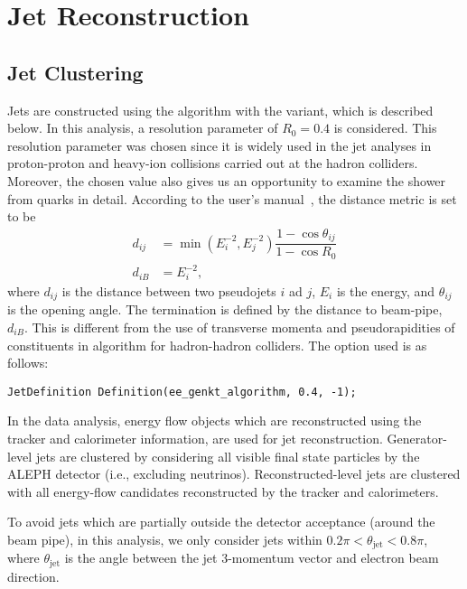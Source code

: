 \section{Jet Reconstruction}\label{Section:JetReconstruction}

\subsection{Jet Clustering}

Jets are constructed using the \ak algorithm with the \ee variant, which is described below. In this analysis, a resolution parameter of $R_0 = 0.4$ is considered. This resolution parameter was chosen since it is widely used in the jet analyses in proton-proton and heavy-ion collisions carried out at the hadron colliders. Moreover, the chosen value also gives us an opportunity to examine the shower from quarks in detail. According to the \fastjet user's manual~\cite{Cacciari:2005hq,Cacciari:2011ma}, the distance metric is set to be
%
\begin{align}
    d_{ij} &= \min\left(E_i^{-2}, E_j^{-2}\right) \dfrac{1 - \cos \theta_{ij}}{1 - \cos R_0}\\
    d_{iB} &= E_i^{-2},
\end{align}
%
where $d_{ij}$ is the distance between two pseudojets $i$ ad $j$, $E_i$ is the energy, and $\theta_{ij}$ is the opening angle.  The termination is defined by the distance to beam-pipe, $d_{iB}$. This is different from the use of transverse momenta and pseudorapidities of constituents in algorithm for hadron-hadron colliders.  The option used is as follows:
%
\begin{verbatim}
JetDefinition Definition(ee_genkt_algorithm, 0.4, -1);
\end{verbatim}

In the data analysis, energy flow objects which are reconstructed using the tracker and calorimeter information, are used for jet reconstruction. Generator-level jets are clustered by considering all visible final state particles by the ALEPH detector (i.e., excluding neutrinos).  Reconstructed-level jets are clustered with all energy-flow candidates reconstructed by the tracker and calorimeters.

To avoid jets which are partially outside the detector acceptance (around the beam pipe), in this analysis, we only consider jets within $0.2\pi < \theta_\text{jet} < 0.8\pi$, where $\theta_\text{jet}$ is the angle between the jet 3-momentum vector and electron beam direction.

